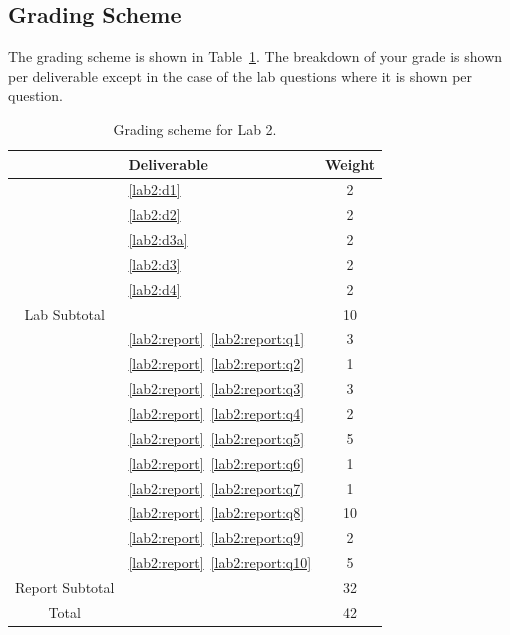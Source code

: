 \subsection{Grading Scheme}
The grading scheme is shown in Table~\ref{tab:lab2:grading}. The breakdown of
your grade is shown per deliverable except in the case of the lab
questions where it is shown per question.
%
\begin{table}
\centering
\begin{tabular}{c|l|c}
        & Deliverable           & Weight  \\ \hline
        & \ref{lab2:d1}         & 2       \\ \hline
        & \ref{lab2:d2}         & 2       \\ \hline
        & \ref{lab2:d3a}        & 2       \\ \hline
        & \ref{lab2:d3}         & 2       \\ \hline
        & \ref{lab2:d4}         & 2       \\ \hhline{=|=|=}
Lab Subtotal&                       & 10      \\ \hhline{=|=|=}
        & \ref{lab2:report}~\ref{lab2:report:q1}  & 3       \\ \hline
        & \ref{lab2:report}~\ref{lab2:report:q2}  & 1       \\ \hline
        & \ref{lab2:report}~\ref{lab2:report:q3}  & 3       \\ \hline
        & \ref{lab2:report}~\ref{lab2:report:q4}  & 2       \\ \hline
        & \ref{lab2:report}~\ref{lab2:report:q5}  & 5      \\ \hline
        & \ref{lab2:report}~\ref{lab2:report:q6}  & 1       \\ \hline
        & \ref{lab2:report}~\ref{lab2:report:q7}  & 1       \\ \hline
        & \ref{lab2:report}~\ref{lab2:report:q8}  & 10      \\ \hline
        & \ref{lab2:report}~\ref{lab2:report:q9}  & 2       \\ \hline
        & \ref{lab2:report}~\ref{lab2:report:q10} & 5       \\ \hhline{=|=|=}
Report Subtotal&  & 32 \\ \hhline{=|=|=}
  Total &                       & 42
\end{tabular}
\caption[Grading Scheme for Lab 2]{Grading scheme for Lab 2.}
\label{tab:lab2:grading}
\end{table}
%
